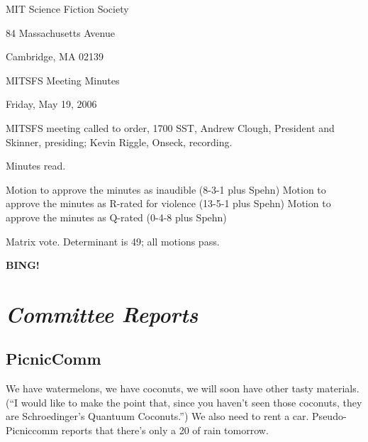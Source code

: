 \documentclass[10pt]{article}
\newcommand{\bing}{{\bf BING!} }
\newcommand{\goto}[1]{\bing \vskip 12pt \section*{{\em{#1}}}}
\newcommand{\ps}{ plus Spehn\xspace}
\begin{document}
\begin{center}

MIT Science Fiction Society

84 Massachusetts Avenue

Cambridge, MA 02139

\vspace{12pt}

MITSFS Meeting Minutes

Friday, May 19, 2006

\end{center}

\vspace{18pt}

\setlength{\parskip}{6pt}

\noindent
MITSFS meeting called to order, 1700 SST,
Andrew Clough, President and Skinner, presiding; Kevin Riggle, Onseck, recording.

Minutes read.

Motion to approve the minutes as inaudible (8-3-1\ps)
Motion to approve the minutes as R-rated for violence (13-5-1\ps)
Motion to approve the minutes as Q-rated (0-4-8\ps)

Matrix vote.  Determinant is 49; all motions pass.

\goto{Committee Reports}

\subsection*{PicnicComm}
We have watermelons, we have coconuts, we will soon have other tasty materials.  (``I would like to
make the point that, since you haven't seen those coconuts, they are Schroedinger's Quantuum 
Coconuts.'')  We also need to rent a car.  Pseudo-Picniccomm reports that there's only a 20%
of rain tomorrow.




\end{document}
